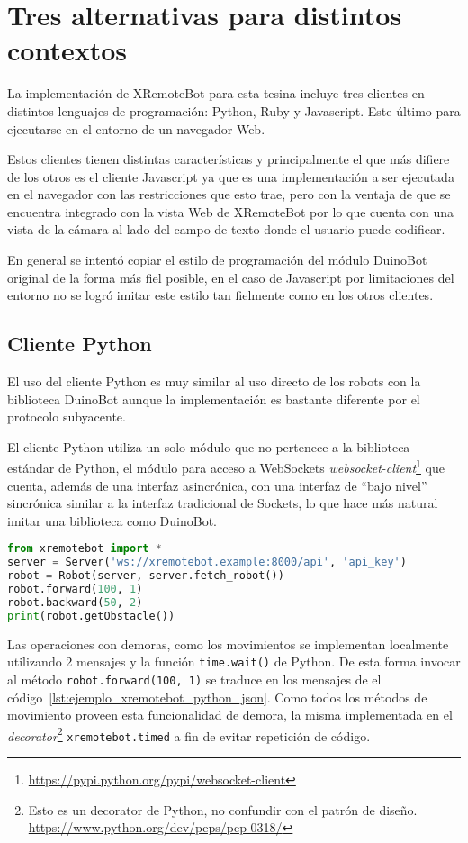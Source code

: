 \chapter{Tres alternativas para distintos contextos}\label{cha:clientes}

La implementación de XRemoteBot para esta tesina incluye tres clientes en distintos
lenguajes de programación: Python, Ruby y Javascript. Este último para ejecutarse
en el entorno de un navegador Web.

Estos clientes tienen distintas características y principalmente el que más difiere
de los otros es el cliente Javascript ya que es una implementación a ser ejecutada
en el navegador con las restricciones que esto trae, pero con la ventaja de que
se encuentra integrado con la vista Web de XRemoteBot por lo que cuenta con una
vista de la cámara al lado del campo de texto donde el usuario puede codificar.

En general se intentó copiar el estilo de programación del módulo DuinoBot original
de la forma más fiel posible, en el caso de Javascript por limitaciones del entorno
no se logró imitar este estilo tan fielmente como en los otros clientes.

\section{Cliente Python}\label{sec:python}
El uso del cliente Python es muy similar al uso directo de los robots con la
biblioteca DuinoBot aunque la implementación es bastante diferente por el protocolo
subyacente.

El cliente Python utiliza un solo módulo que no pertenece a la biblioteca estándar
de Python, el módulo para acceso a WebSockets
\textit{websocket-client}\footnote{\url{https://pypi.python.org/pypi/websocket-client}}
que cuenta, además de una interfaz asincrónica, con una interfaz de ``bajo nivel''
sincrónica similar a la interfaz tradicional de Sockets, lo que hace más
natural imitar una biblioteca como DuinoBot.

\begin{lstlisting}[language=Python,
caption={Ejemplo con XRemoteBot para Python},label=lst:ejemplo_xremotebot_python]
from xremotebot import *
server = Server('ws://xremotebot.example:8000/api', 'api_key')
robot = Robot(server, server.fetch_robot())
robot.forward(100, 1)
robot.backward(50, 2)
print(robot.getObstacle())
\end{lstlisting}


Las operaciones con demoras, como los movimientos se implementan localmente
utilizando 2 mensajes y la función \texttt{time.wait()} de Python. De esta
forma
invocar al método \texttt{robot.forward(100, 1)} se traduce en los mensajes
de
el código~\ref{lst:ejemplo_xremotebot_python_json}. Como todos los métodos
de movimiento
proveen esta funcionalidad de demora, la misma implementada en el
\textit{decorator}\footnote{Esto es un decorator de Python, no confundir
con el patrón de diseño. \url{https://www.python.org/dev/peps/pep-0318/}}
\texttt{xremotebot.timed} a fin de evitar repetición de código.

